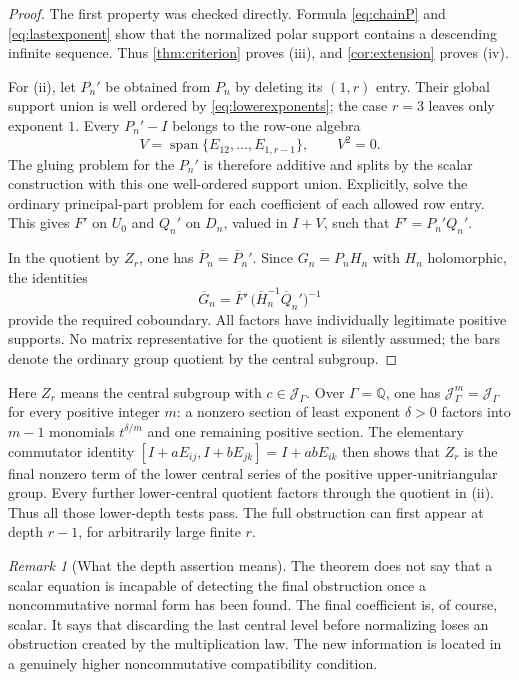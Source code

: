 \documentclass[11pt,letterpaper]{article}
\theoremstyle{definition}
\theoremstyle{remark}
\newtheorem{remark}[remark]{Remark}
\newcommand{\Q}{\mathbb Q}
\newcommand{\JJ}{\mathscr J_\Gamma}
\numberwithin{equation}{section}
\begin{document}
\begin{proof}
The first property was checked directly. Formula \eqref{eq:chainP} and \eqref{eq:lastexponent} show that the normalized polar support contains a descending infinite sequence. Thus \cref{thm:criterion} proves (iii), and \cref{cor:extension} proves (iv).

For (ii), let $P_n'$ be obtained from $P_n$ by deleting its $(1,r)$ entry. Their global support union is well ordered by \eqref{eq:lowerexponents}; the case $r=3$ leaves only exponent $1$. Every $P_n'-I$ belongs to the row-one algebra
\[
 V=\operatorname{span}\{E_{12},\ldots,E_{1,r-1}\},
 \qquad V^2=0.
\]
The gluing problem for the $P_n'$ is therefore additive and splits by the scalar construction with this one well-ordered support union. Explicitly, solve the ordinary principal-part problem for each coefficient of each allowed row entry. This gives $F'$ on $U_0$ and $Q_n'$ on $D_n$, valued in $I+V$, such that $F'=P_n'Q_n'$.

In the quotient by $Z_r$, one has $\overline P_n=\overline P_n'$. Since $G_n=P_nH_n$ with $H_n$ holomorphic, the identities
\[
 \overline G_n
 =\overline F'\,
   \bigl(\overline H_n^{-1}\overline Q_n'\bigr)^{-1}
\]
provide the required coboundary. All factors have individually legitimate positive supports. No matrix representative for the quotient is silently assumed; the bars denote the ordinary group quotient by the central subgroup.
\end{proof}

Here $Z_r$ means the central subgroup with $c\in\JJ$. Over $\Gamma=\Q$, one has $\JJ^m=\JJ$ for every positive integer $m$: a nonzero section of least exponent $\delta>0$ factors into $m-1$ monomials $t^{\delta/m}$ and one remaining positive section. The elementary commutator identity $[I+aE_{ij},I+bE_{jk}]=I+abE_{ik}$ then shows that $Z_r$ is the final nonzero term of the lower central series of the positive upper-unitriangular group. Every further lower-central quotient factors through the quotient in (ii). Thus all those lower-depth tests pass. The full obstruction can first appear at depth $r-1$, for arbitrarily large finite $r$.

\begin{remark}[What the depth assertion means]
The theorem does not say that a scalar equation is incapable of detecting the final obstruction once a noncommutative normal form has been found. The final coefficient is, of course, scalar. It says that discarding the last central level before normalizing loses an obstruction created by the multiplication law. The new information is located in a genuinely higher noncommutative compatibility condition.
\end{remark}
\end{document}
